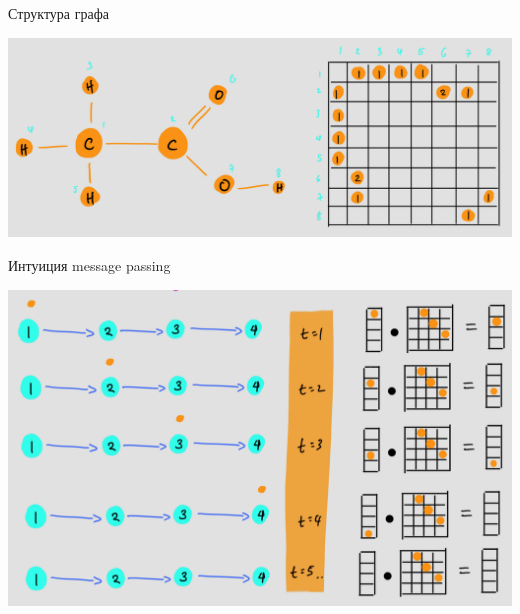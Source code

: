 \documentclass[11pt,aspectratio=169,handout]{beamer}
\begin{document}
\begin{frame}{Структура графа}

\begin{center}
\includegraphics[scale=0.15]{images/ethanoic-acid-weighted-adjacency.png}
\end{center}

\end{frame}

\begin{frame}{Интуиция message passing}

\begin{center}
\includegraphics[scale=0.24]{images/message-passing-chain.png}
\end{center}

\end{frame}
\end{document}
